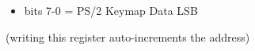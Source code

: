 \begin{itemize}
\item bits 7-0 = PS/2 Keymap Data LSB
\end{itemize}
(writing this register auto-increments the address)

